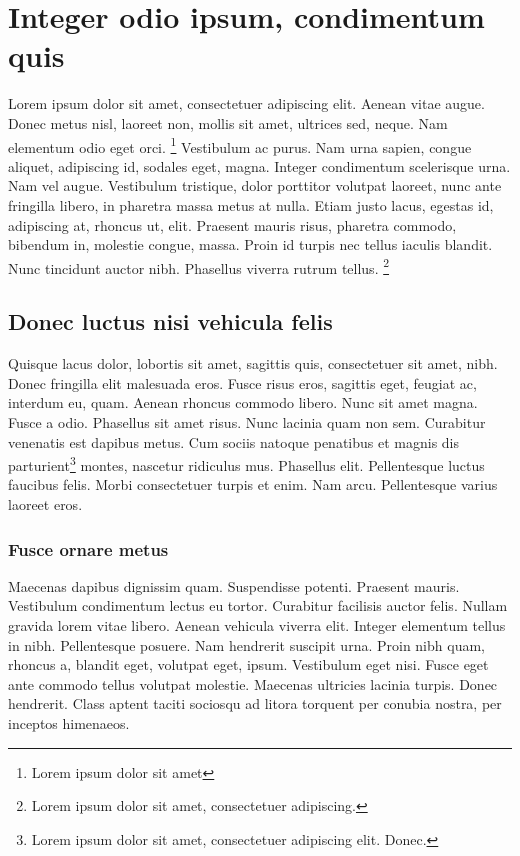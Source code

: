 \chapter{Integer odio ipsum, condimentum quis}
Lorem ipsum dolor sit amet, consectetuer adipiscing elit. Aenean vitae augue. Donec metus nisl, laoreet non, mollis sit amet, ultrices sed, neque. Nam elementum odio eget orci. \footnote{Lorem ipsum dolor sit amet} Vestibulum ac purus. Nam urna sapien, congue aliquet, adipiscing id, sodales eget, magna. Integer condimentum scelerisque urna. Nam vel augue. Vestibulum tristique, dolor porttitor volutpat laoreet, nunc ante fringilla libero, in pharetra massa metus at nulla. Etiam justo lacus, egestas id, adipiscing at, rhoncus ut, elit. Praesent mauris risus, pharetra commodo, bibendum in, molestie congue, massa. Proin id turpis nec tellus iaculis blandit. Nunc tincidunt auctor nibh. Phasellus viverra rutrum tellus. \footnote{Lorem ipsum dolor sit amet, consectetuer adipiscing.}

\section{Donec luctus nisi vehicula felis}
Quisque lacus dolor, lobortis sit amet, sagittis quis, consectetuer sit amet, nibh. Donec fringilla elit malesuada eros. Fusce risus eros, sagittis eget, feugiat ac, interdum eu, quam. Aenean rhoncus commodo libero. Nunc sit amet magna. Fusce a odio. Phasellus sit amet risus. Nunc lacinia quam non sem. Curabitur venenatis est dapibus metus. Cum sociis natoque penatibus et magnis dis parturient\footnote{Lorem ipsum dolor sit amet, consectetuer adipiscing elit. Donec.} montes, nascetur ridiculus mus. Phasellus elit. Pellentesque luctus faucibus felis. Morbi consectetuer turpis et enim. Nam arcu. Pellentesque varius laoreet eros.

\subsection{Fusce ornare metus}
Maecenas dapibus dignissim quam. Suspendisse potenti. Praesent mauris. Vestibulum condimentum lectus eu tortor. Curabitur facilisis auctor felis. Nullam gravida lorem vitae libero. Aenean vehicula viverra elit. Integer elementum tellus in nibh. Pellentesque posuere. Nam hendrerit suscipit urna. Proin nibh quam, rhoncus a, blandit eget, volutpat eget, ipsum. Vestibulum eget nisi. Fusce eget ante commodo tellus volutpat molestie. Maecenas ultricies lacinia turpis. Donec hendrerit. Class aptent taciti sociosqu ad litora torquent per conubia nostra, per inceptos himenaeos.

